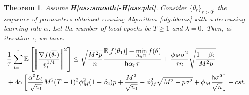 \documentclass[11pt]{article}
\newtheorem*{Theorem*}{Theorem}
\newcommand{\beq}{\begin{equation}}
\newcommand{\eeq}{\end{equation}}
\def\EE{\mathbb{E}}
\def\tot{\mathsf{h}}
\begin{document}
\begin{Theorem*}
Assume \textbf{H\ref{ass:smooth}-H\ref{ass:phi}}. Consider $\{\overline{\theta_r}\}_{r>0}$, the sequence of parameters obtained running Algorithm~\ref{alg:ldams} with a decreasing learning rate $\alpha$. Let the number of local epochs be $T \geq 1$ and $\lambda = 0$. Then, at iteration $\tau$, we have:
\beq \notag
\begin{split}
&  \frac{1}{\tau}\sum_{t=1}^\tau  \EE\left[ \left\| \frac{\nabla f(\overline{\theta_t})}{\hat v_t^{1/4}}   \right \|^2 \right] \leq    \sqrt{\frac{M^2 p}{n}}  \frac{ \EE[f(\bar{\theta}_1)]  - \min \limits_{\theta \in \Theta} f(\theta)}{\tot \alpha_r \tau} +      \frac{\phi_M   \sigma^2}{\tau n} \sqrt{\frac{1 - \beta_2}{M^2 p}  } \\
    &   +4\alpha \left[ \frac{\alpha^2 L_\ell}{\sqrt{v_0}} M^2 (T-1)^2 \phi_M^2 (1-\beta_2)p + \frac{M^2}{\sqrt{v_0}}+\phi_M^2\sqrt{M^2+p\sigma^2} + \phi_M \frac{\tot \sigma^2}{\sqrt{n}}\right]   + cst. \\
   \end{split}
\eeq
\end{Theorem*}
\end{document}
